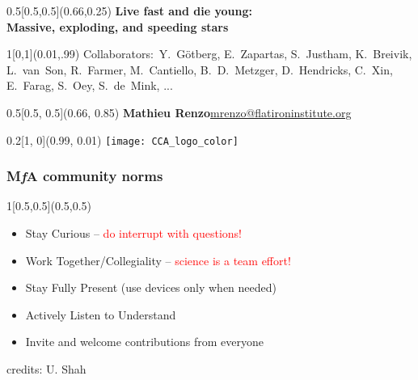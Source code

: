 \documentclass[xcolor=dvipsnames,professionalfonts, aspectratio=169]{beamer}
\begin{document}
\bgroup
{}
\begin{frame}[plain]
  \begin{textblock}{0.5}[0.5,0.5](0.66,0.25)
    \centering
    \textbf{\textcolor{white!80!Yellow}{{\Large Live fast and die
          young:\\}
        Massive, exploding, and speeding stars}}
  \end{textblock}

  \begin{textblock}{1}[0,1](0.01,.99)%
    \textcolor{white!80!Yellow}{\tiny
      Collaborators:~Y.~G\"otberg, E.~Zapartas, S.~Justham,
      K.~Breivik, L.~van~Son, R.~Farmer, M.~Cantiello,
      B.~D.~Metzger, D.~Hendricks,
      C.~Xin, E.~Farag, S.~Oey, S.~de~Mink, ...}
  \end{textblock}

  \begin{textblock}{0.5}[0.5, 0.5](0.66, 0.85)
    \centering
    \textcolor{white!80!Yellow}{\textbf{\large Mathieu
        Renzo}}\linebreak  \textcolor{whiteish}{\footnotesize\href{mailto:mrenzo@flatironinstitute.org}{mrenzo@flatironinstitute.org}}
  \end{textblock}

  \begin{textblock}{0.2}[1, 0](0.99, 0.01)
    \texttt{[image: CCA\_logo\_color]}
  \end{textblock}
\end{frame}
\egroup


\begin{frame}
  \frametitle{M\emph{f}A community norms}
  \begin{textblock}{1}[0.5,0.5](0.5,0.5)
    \centering
    \begin{itemize}\large
    \item Stay Curious -- \textcolor{red}{do interrupt with questions!}
    \item Work Together/Collegiality -- \textcolor{red}{science is a
        team effort!}
    \item Stay Fully Present (use devices only when needed)
    \item Actively Listen to Understand
    \item Invite and welcome contributions from everyone
    \end{itemize}
    \hfill\textcolor{gray!50}{\tiny credits: U. Shah}\hspace*{60pt}\,
  \end{textblock}
\end{frame}
\end{document}
